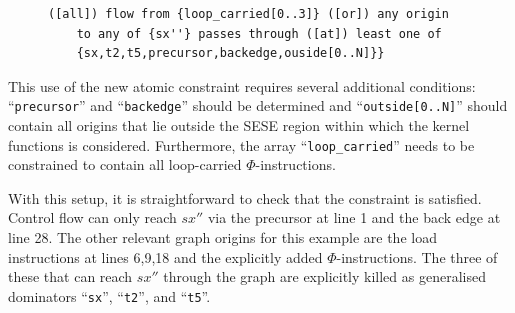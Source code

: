 \begin{figure}[h]
    \centering
    \begin{lstlisting}[language=IDL]
([all]) flow from {loop_carried[0..3]} ([or]) any origin
    to any of {sx''} passes through ([at]) least one of
    {sx,t2,t5,precursor,backedge,ouside[0..N]}}
    \end{lstlisting}
\end{figure}

    \noindent
    This use of the new atomic constraint requires several additional
    conditions:
    ``\texttt{precursor}'' and ``\texttt{backedge}'' should be determined
    and ``\texttt{outside[0..N]}'' should contain all origins that lie outside
    the SESE region within which the kernel functions is considered.
    Furthermore, the array ``\texttt{loop\_carried}'' needs to be constrained to
    contain all loop-carried $\Phi$-instructions.

    With this setup, it is straightforward to check that the constraint is
    satisfied.
    Control flow can only reach $sx''$ via the precursor at line 1 and the
    back edge at line 28.
    The other relevant graph origins for this example are the load
    instructions at lines 6,9,18 and the explicitly added $\Phi$-instructions.
    The three of these that can reach $sx''$ through the graph are explicitly
    killed as generalised dominators ``{\tt sx}'', ``{\tt t2}'', and
    ``{\tt t5}''.

